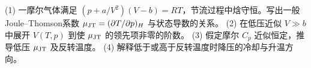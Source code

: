 (1) 一摩尔气体满足 \((p+a/V^2)(V-b)=RT\)，节流过程中焓守恒。写出一般Joule–Thomson系数 \(\mu_{\rm JT}=(\partial T/\partial p)_H\) 与状态导数的关系。
(2) 在低压近似 \(V\gg b\) 中展开 \(V(T,p)\) 到使 \(\mu_{\rm JT}\) 的领先项非零的阶数。
(3) 假定摩尔 \(C_p\) 近似恒定，推导低压 \(\mu_{\rm JT}\) 及反转温度。
(4) 解释低于或高于反转温度时降压的冷却与升温方向。
